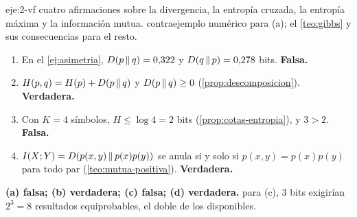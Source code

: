 \begin{solucion}{eje:2-vf}
\datos cuatro afirmaciones sobre la divergencia, la entropía cruzada, la entropía máxima y la información mutua.
\planteamiento contraejemplo numérico para (a); el \cref{teo:gibbs} y sus consecuencias para el resto.
\pasos
\begin{enumerate}[label=(\alph*)]
  \item En el \cref{ej:asimetria}, $D(p\,\|\,q)=0{,}322$ y $D(q\,\|\,p)=0{,}278$ bits. \textbf{Falsa.}
  \item $H(p,q)=H(p)+D(p\,\|\,q)$ y $D(p\,\|\,q)\ge0$ (\cref{prop:descomposicion}). \textbf{Verdadera.}
  \item Con $K=4$ símbolos, $H\le\log 4=2$ bits (\cref{prop:cotas-entropia}), y $3>2$. \textbf{Falsa.}
  \item $I(X;Y)=D(p(x,y)\,\|\,p(x)p(y))$ se anula si y solo si $p(x,y)=p(x)p(y)$ para todo par (\cref{teo:mutua-positiva}). \textbf{Verdadera.}
\end{enumerate}
\resultado \textbf{(a) falsa; (b) verdadera; (c) falsa; (d) verdadera.}
\comprobacion para (c), 3 bits exigirían $2^{3}=8$ resultados equiprobables, el doble de los disponibles.
\end{solucion}

